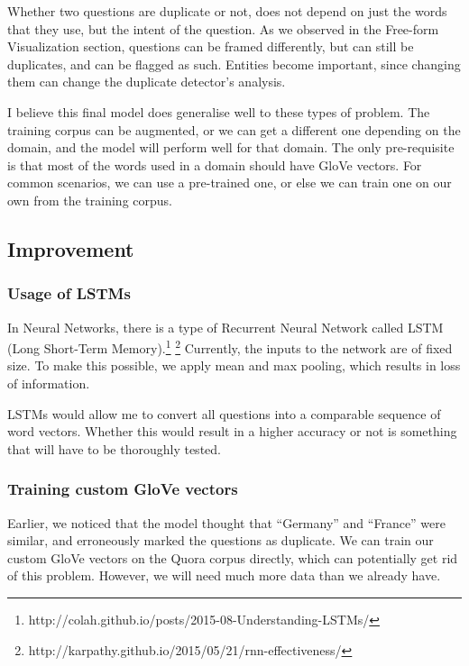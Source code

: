 \documentclass{article}
\begin{document}
Whether two questions are duplicate or not, does not depend on just the words that they use, but the intent of the question. As we observed in the Free-form Visualization section, questions can be framed differently, but can still be duplicates, and can be flagged as such. Entities become important, since changing them can change the duplicate detector's analysis.

I believe this final model does generalise well to these types of problem. The training corpus can be augmented, or we can get a different one depending on the domain, and the model will perform well for that domain. The only pre-requisite is that most of the words used in a domain should have GloVe vectors. For common scenarios, we can use a pre-trained one, or else we can train one on our own from the training corpus.

\subsection {Improvement}

\subsubsection{Usage of LSTMs}

In Neural Networks, there is a type of Recurrent Neural Network called LSTM (Long Short-Term Memory).\footnote{http://colah.github.io/posts/2015-08-Understanding-LSTMs/} \footnote{http://karpathy.github.io/2015/05/21/rnn-effectiveness/} Currently, the inputs to the network are of fixed size. To make this possible, we apply mean and max pooling, which results in loss of information.

LSTMs would allow me to convert all questions into a comparable sequence of word vectors. Whether this would result in a higher accuracy or not is something that will have to be thoroughly tested.

\subsubsection{Training custom GloVe vectors}

Earlier, we noticed that the model thought that ``Germany'' and ``France'' were similar, and erroneously marked the questions as duplicate. We can train our custom GloVe vectors on the Quora corpus directly, which can potentially get rid of this problem. However, we will need much more data than we already have.
\end{document}
